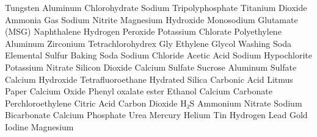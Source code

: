 \answerkey
{} Tungsten
 Aluminum Chlorohydrate
 Sodium Tripolyphosphate
 Titanium Dioxide
 Ammonia Gas
 Sodium Nitrite
 Magnesium Hydroxide
 Monosodium Glutamate (MSG)
 Naphthalene
 Hydrogen Peroxide
 Potassium Chlorate
 Polyethylene
 Aluminum Zirconium Tetrachlorohydrex Gly
 Ethylene Glycol
 Washing Soda
 Elemental Sulfur
 Baking Soda
 Sodium Chloride
 Acetic Acid
 Sodium Hypochlorite
 Potassium Nitrate
 Silicon Dioxide
 Calcium Sulfate
 Sucrose
 Aluminum Sulfate
 Calcium Hydroxide
 Tetrafluoroethane
 Hydrated Silica
 Carbonic Acid
 Litmus Paper
 Calcium Oxide
 Phenyl oxalate ester
 Ethanol
 Calcium Carbonate
 Perchloroethylene
 Citric Acid
 Carbon Dioxide
 H₂S
 Ammonium Nitrate
 Sodium Bicarbonate
 Calcium Phosphate
 Urea
 Mercury
 Helium
 Tin
 Hydrogen
 Lead
 Gold
 Iodine
 Magnesium
\endanswerkey